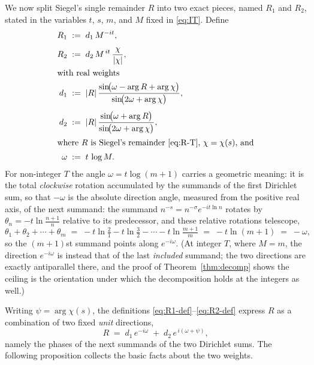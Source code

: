 \documentclass[11pt]{article}
\theoremstyle{definition}
\begin{document}
We now split Siegel's single remainder $R$ into two exact pieces, named
$R_{1}$ and $R_{2}$, stated in the variables $t$, $s$, $m$, and $M$ fixed
in \eqref{eq:IT}. Define
\begin{align}
R_{1} &\;:=\; d_{1}\, M^{-it},
\label{eq:R1-def}\\[4pt]
R_{2} &\;:=\; d_{2}\, M^{\,it}\,
\frac{\chi}{|\chi|},
\label{eq:R2-def}\\
\intertext{with real weights}
d_{1} &\;:=\; |R|\,
\frac{\sin\!\bigl(\omega - \arg R + \arg\chi\bigr)}{\sin\!\bigl(2\omega + \arg\chi\bigr)},
\label{eq:d1}\\[4pt]
d_{2} &\;:=\; |R|\,
\frac{\sin\!\bigl(\omega + \arg R\bigr)}{\sin\!\bigl(2\omega + \arg\chi\bigr)},
\label{eq:d2}\\
\intertext{where $R$ is Siegel's remainder \eqref{eq:R-T}, $\chi=\chi(s)$, and}
\omega &\;:=\; t\,\log M .
\label{eq:omega-def}
\end{align}
For non-integer $T$ the angle $\omega=t\log(m+1)$ carries a
geometric meaning: it is the total \emph{clockwise} rotation accumulated
by the summands of the first Dirichlet sum, so that $-\omega$ is the
absolute direction angle, measured from the positive real axis, of the
next summand: the summand $n^{-s}=n^{-\sigma}e^{-it\ln n}$
rotates by $\theta_n=-t\ln\tfrac{n+1}{n}$ relative to its predecessor, and these
relative rotations telescope,
\begin{equation}\label{eq:omega-telescope}
\theta_1+\theta_2+\cdots+\theta_m
\;=\;
-t\ln\tfrac{2}{1}-t\ln\tfrac{3}{2}-\cdots-t\ln\tfrac{m+1}{m}
\;=\;
-t\ln(m+1)
\;=\;
-\omega,
\end{equation}
so the $(m+1)$st summand points along $e^{-i\omega}$. (At integer $T$,
where $M=m$, the direction $e^{-i\omega}$ is instead that of
the last \emph{included} summand; the two directions are exactly
antiparallel there, and the proof of Theorem~\ref{thm:decomp} shows the
ceiling is the orientation under which the decomposition holds at the
integers as well.)

Writing $\psi=\arg\chi(s)$, the
definitions \eqref{eq:R1-def}--\eqref{eq:R2-def} express $R$ as a combination
of two fixed \emph{unit} directions,
\begin{equation}\label{eq:R-two-dirs}
R \;=\; d_1\,e^{-i\omega} \;+\; d_2\,e^{\,i(\omega+\psi)},
\end{equation}
namely the phases of the next summands of the two Dirichlet sums. The following
proposition collects the basic facts about the two weights.
\end{document}
